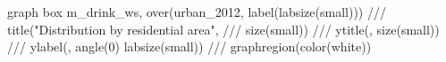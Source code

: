 graph box m_drink_ws, over(urban_2012, label(labsize(small))) ///
title("Distribution by residential area", ///
          size(small)) ///
ytitle(, size(small)) ///
ylabel(, angle(0) labsize(small)) ///
graphregion(color(white))                                                               
